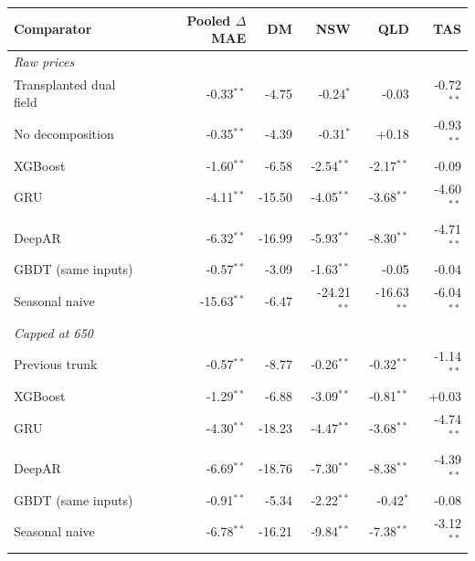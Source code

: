 \begin{tabular}{lrrrrr}
\toprule
Comparator & Pooled $\Delta$MAE & DM & NSW & QLD & TAS \\
\midrule
\multicolumn{6}{l}{\emph{Raw prices}} \\
Transplanted dual field & -0.33$^{**}$ & -4.75 & -0.24$^{*}$ & -0.03 & -0.72$^{**}$ \\
No decomposition & -0.35$^{**}$ & -4.39 & -0.31$^{*}$ & +0.18 & -0.93$^{**}$ \\
XGBoost & -1.60$^{**}$ & -6.58 & -2.54$^{**}$ & -2.17$^{**}$ & -0.09 \\
GRU & -4.11$^{**}$ & -15.50 & -4.05$^{**}$ & -3.68$^{**}$ & -4.60$^{**}$ \\
DeepAR & -6.32$^{**}$ & -16.99 & -5.93$^{**}$ & -8.30$^{**}$ & -4.71$^{**}$ \\
GBDT (same inputs) & -0.57$^{**}$ & -3.09 & -1.63$^{**}$ & -0.05 & -0.04 \\
Seasonal naive & -15.63$^{**}$ & -6.47 & -24.21$^{**}$ & -16.63$^{**}$ & -6.04$^{**}$ \\
\midrule
\multicolumn{6}{l}{\emph{Capped at 650}} \\
Previous trunk & -0.57$^{**}$ & -8.77 & -0.26$^{**}$ & -0.32$^{**}$ & -1.14$^{**}$ \\
XGBoost & -1.29$^{**}$ & -6.88 & -3.09$^{**}$ & -0.81$^{**}$ & +0.03 \\
GRU & -4.30$^{**}$ & -18.23 & -4.47$^{**}$ & -3.68$^{**}$ & -4.74$^{**}$ \\
DeepAR & -6.69$^{**}$ & -18.76 & -7.30$^{**}$ & -8.38$^{**}$ & -4.39$^{**}$ \\
GBDT (same inputs) & -0.91$^{**}$ & -5.34 & -2.22$^{**}$ & -0.42$^{*}$ & -0.08 \\
Seasonal naive & -6.78$^{**}$ & -16.21 & -9.84$^{**}$ & -7.38$^{**}$ & -3.12$^{**}$ \\
\bottomrule
\end{tabular}
